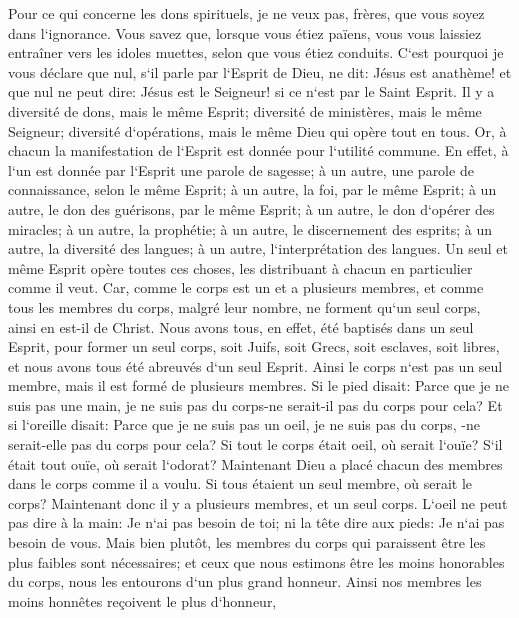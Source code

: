 \verse Pour ce qui concerne les dons spirituels, je ne veux pas, frères, que vous soyez dans l`ignorance. 
\verse Vous savez que, lorsque vous étiez païens, vous vous laissiez entraîner vers les idoles muettes, selon que vous étiez conduits. 
\verse C`est pourquoi je vous déclare que nul, s`il parle par l`Esprit de Dieu, ne dit: Jésus est anathème! et que nul ne peut dire: Jésus est le Seigneur! si ce n`est par le Saint Esprit. 
\verse Il y a diversité de dons, mais le même Esprit; 
\verse diversité de ministères, mais le même Seigneur; 
\verse diversité d`opérations, mais le même Dieu qui opère tout en tous. 
\verse Or, à chacun la manifestation de l`Esprit est donnée pour l`utilité commune. 
\verse En effet, à l`un est donnée par l`Esprit une parole de sagesse; à un autre, une parole de connaissance, selon le même Esprit; 
\verse à un autre, la foi, par le même Esprit; à un autre, le don des guérisons, par le même Esprit; 
\verse à un autre, le don d`opérer des miracles; à un autre, la prophétie; à un autre, le discernement des esprits; à un autre, la diversité des langues; à un autre, l`interprétation des langues. 
\verse Un seul et même Esprit opère toutes ces choses, les distribuant à chacun en particulier comme il veut. 
\verse Car, comme le corps est un et a plusieurs membres, et comme tous les membres du corps, malgré leur nombre, ne forment qu`un seul corps, ainsi en est-il de Christ. 
\verse Nous avons tous, en effet, été baptisés dans un seul Esprit, pour former un seul corps, soit Juifs, soit Grecs, soit esclaves, soit libres, et nous avons tous été abreuvés d`un seul Esprit. 
\verse Ainsi le corps n`est pas un seul membre, mais il est formé de plusieurs membres. 
\verse Si le pied disait: Parce que je ne suis pas une main, je ne suis pas du corps-ne serait-il pas du corps pour cela? 
\verse Et si l`oreille disait: Parce que je ne suis pas un oeil, je ne suis pas du corps, -ne serait-elle pas du corps pour cela? 
\verse Si tout le corps était oeil, où serait l`ouïe? S`il était tout ouïe, où serait l`odorat? 
\verse Maintenant Dieu a placé chacun des membres dans le corps comme il a voulu. 
\verse Si tous étaient un seul membre, où serait le corps? 
\verse Maintenant donc il y a plusieurs membres, et un seul corps. 
\verse L`oeil ne peut pas dire à la main: Je n`ai pas besoin de toi; ni la tête dire aux pieds: Je n`ai pas besoin de vous. 
\verse Mais bien plutôt, les membres du corps qui paraissent être les plus faibles sont nécessaires; 
\verse et ceux que nous estimons être les moins honorables du corps, nous les entourons d`un plus grand honneur. Ainsi nos membres les moins honnêtes reçoivent le plus d`honneur, 
